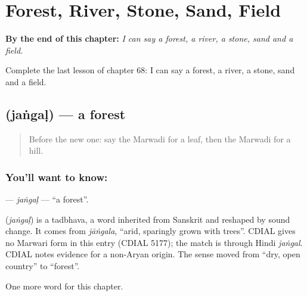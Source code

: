 
\chapter{Forest, River, Stone, Sand, Field}
\label{ch:mw-forest-river-stone-sand-field}

\begin{chapteropening}
\textbf{By the end of this chapter:} \emph{I can say a forest, a river, a stone, sand and a field.}

Complete the last lesson of chapter 68: I can say a forest, a river, a stone, sand and a field.
\end{chapteropening}

\section[\texorpdfstring{\mw{जंगळ} (jaṅgaḷ)}{जंगळ (jaṅgaḷ)}]{ (jaṅgaḷ) — a forest}

\label{lesson:MW-C68-jangal}



\begin{quote}
Before the new one: say the Marwadi for a leaf, then the Marwadi for a hill.
\end{quote}

\subsection*{You'll want to know: }
\textbf{} — \emph{jaṅgaḷ} — \textquotedblleft{}a forest\textquotedblright{}.

\begin{cousinweb}
\textbf{} (\emph{jaṅgaḷ}) is a tadbhava, a word inherited from Sanskrit and reshaped by sound change. It comes from \emph{jāṅgala}, \textquotedblleft{}arid, sparingly grown with trees\textquotedblright{}. CDIAL gives no Marwari form in this entry (CDIAL 5177); the match is through Hindi \emph{jaṅgal}. CDIAL notes evidence for a non-Aryan origin. The sense moved from \textquotedblleft{}dry, open country\textquotedblright{} to \textquotedblleft{}forest\textquotedblright{}.
\end{cousinweb}

\begin{grammarlens}[title={What you've built}]
One more word for this chapter.
\end{grammarlens}

